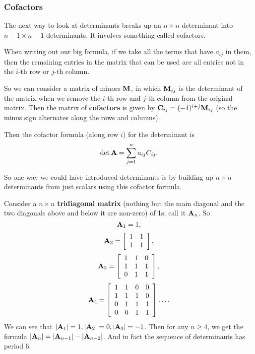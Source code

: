 \subsubsection{Cofactors}

The next way to look at determinants breaks up an $n \times n$ determinant into $n-1 \times n-1$ determinants. It involves something called cofactors. 

When writing out our big formula, if we take all the terms that have $a_{ij}$ in them, then the remaining entries in the matrix that can be used are all entries not in the $i$-th row or $j$-th column. 

So we can consider a matrix of minors $\boldsymbol{\mathbf{M}}$, in which $\boldsymbol{\mathbf{M}}_{ij}$ is the determinant of the matrix when we remove the $i$-th row and $j$-th column from the original matrix. Then the matrix of \textbf{cofactors} is given by $\boldsymbol{\mathbf{C}}_{ij} = (-1)^{i+j} \boldsymbol{\mathbf{M}}_{ij}$ (so the minus sign alternates along the rows and columns). 

Then the cofactor formula (along row $i$) for the determinant is
\[ \mathrm{det}\, \boldsymbol{\mathbf{A}} = \sum_{j=1}^n a_{ij}C_{ij}. \]

So one way we could have introduced determinants is by building up $n \times n$ determinants from just scalars using this cofactor formula. 

\bex
Consider a $n \times n$ \textbf{tridiagonal matrix} (nothing but the main diagonal and the two diagonals above and below it are non-zero) of 1s; call it $\boldsymbol{\mathbf{A}}_n$. So
\[ \boldsymbol{\mathbf{A}}_1 = 1, \]
\[ \boldsymbol{\mathbf{A}}_2 = \left[ \begin{array}{rrrrrrrrrrrrrrrrrrrrrrrrr} 1&1\\1&1\\ \end{array} \right], \]
\[ \boldsymbol{\mathbf{A}}_3 = \left[ \begin{array}{rrrrrrrrrrrrrrrrrrrrrrrrr} 1&1&0\\1&1&1\\0&1&1\\ \end{array} \right], \]
\[ \boldsymbol{\mathbf{A}}_4 = \left[ \begin{array}{rrrrrrrrrrrrrrrrrrrrrrrrr} 1&1&0&0\\1&1&1&0\\0&1&1&1\\0&0&1&1\\ \end{array} \right]\ldots. \]
We can see that $|\boldsymbol{\mathbf{A}}_1| = 1, |\boldsymbol{\mathbf{A}}_2| = 0, |\boldsymbol{\mathbf{A}}_3| = -1$. Then for any $n \ge 4$, we get the formula $|\boldsymbol{\mathbf{A}}_n| = |\boldsymbol{\mathbf{A}}_{n-1}| - |\boldsymbol{\mathbf{A}}_{n-2}|$. And in fact the sequence of determinants has period 6. 
\eex